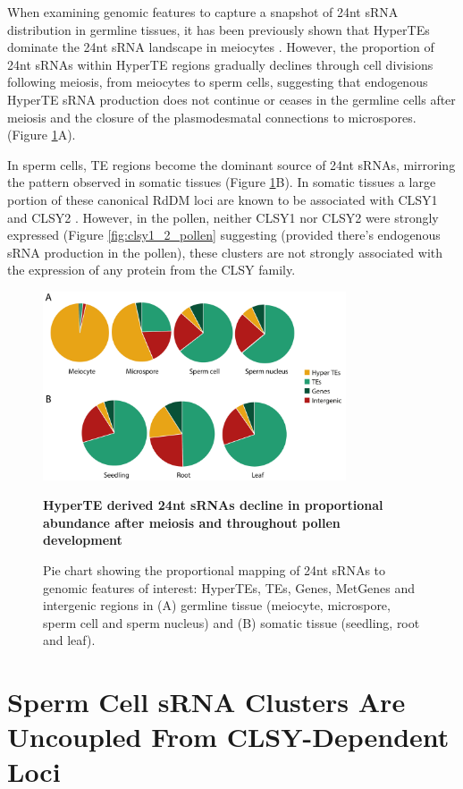 When examining genomic features to capture a snapshot of 24nt sRNA distribution in germline tissues, it has been previously shown that HyperTEs dominate the 24nt sRNA landscape in meiocytes \citep{RN187}. However, the proportion of 24nt sRNAs within HyperTE regions gradually declines through cell divisions following meiosis, from meiocytes to sperm cells, suggesting that endogenous HyperTE sRNA production does not continue or ceases in the germline cells after meiosis and the closure of the plasmodesmatal connections to microspores. (Figure \ref{fig:sRNA_pie}A). 

In sperm cells, TE regions become the dominant source of 24nt sRNAs, mirroring the pattern observed in somatic tissues (Figure \ref{fig:sRNA_pie}B). In somatic tissues a large portion of these canonical RdDM loci are known to be associated with CLSY1 and CLSY2 \citep{RN23}. However, in the pollen, neither CLSY1 nor CLSY2 were strongly expressed (Figure \ref{fig:clsy1_2_pollen} suggesting (provided there's endogenous sRNA production in the pollen), these clusters are not strongly associated with the expression of any protein from the CLSY family.

\begin{figure}[htbp!] 
\centering    
    \includegraphics[width=0.8\textwidth]{Chapter2/Figs/Figure7_Pie_charts.pdf}
\caption{\textbf{HyperTE derived 24nt sRNAs decline in proportional abundance after meiosis and throughout pollen development}}
\label{fig:sRNA_pie}
\captionsetup{font=small}
    \caption*{Pie chart showing the proportional mapping of 24nt sRNAs to genomic features of interest: HyperTEs, TEs, Genes, MetGenes and intergenic regions in (A) germline tissue (meiocyte, microspore, sperm cell and sperm nucleus) and (B) somatic tissue (seedling, root and leaf).}
\end{figure}

\section{Sperm Cell sRNA Clusters Are Uncoupled From CLSY-Dependent Loci}

